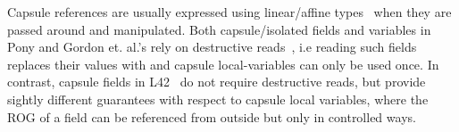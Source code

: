 Capsule references are usually expressed using linear/affine types~\cite{boyland2001alias} when they are passed around and manipulated. Both capsule/isolated fields and variables in Pony and Gordon et. al.'s rely on destructive reads~\cite{GordonEtAl12,clebsch2015deny}, i.e reading such fields replaces their values with \Q@null@ and capsule local-variables can only be used once. In contrast, capsule fields in L42~\cite{ServettoEtAl13a,ServettoZucca15} do not require destructive reads, but provide sightly different guarantees with respect to capsule local variables, where the ROG of a \Q@capsule@ field can be referenced from outside but only in controlled ways.



